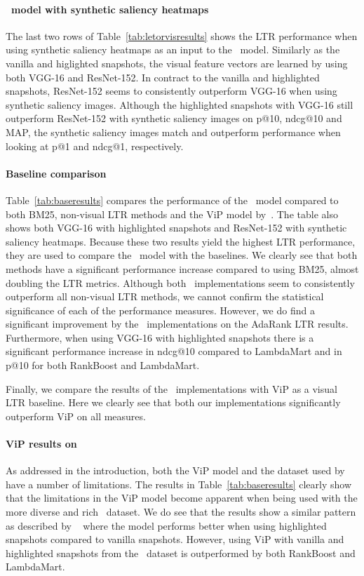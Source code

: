 \paragraph{\modelname~model with synthetic saliency heatmaps}
The last two rows of Table~\ref{tab:letorvisresults} shows the \ac{LTR} performance when using synthetic saliency heatmaps as an input to the \modelname~model. Similarly as the vanilla and higlighted snapshots, the visual feature vectors are learned by using both VGG-16 and ResNet-152. In contract to the vanilla and highlighted snapshots, ResNet-152 seems to consistently outperform VGG-16 when using synthetic saliency images. Although the highlighted snapshots with VGG-16 still outperform ResNet-152 with synthetic saliency images on p@10, ndcg@10 and MAP, the synthetic saliency images match and outperform performance when looking at p@1 and ndcg@1, respectively. 

\paragraph{Baseline comparison}
Table~\ref{tab:baseresults} compares the performance of the \modelname~model compared to both BM25, non-visual \ac{LTR} methods and the ViP model by~\citet{fan2017learning}. 
The table also shows both VGG-16 with highlighted snapshots and ResNet-152 with synthetic saliency heatmaps. Because these two results yield the highest \ac{LTR} performance, they are used to compare the \modelname~model with the baselines. 
We clearly see that both methods have a significant performance increase compared to using BM25, almost doubling the \ac{LTR} metrics.
Although both \modelname~implementations seem to consistently outperform all non-visual \ac{LTR} methods, we cannot confirm the statistical significance of each of the performance measures. 
However, we do find a significant improvement by the \modelname~implementations on the AdaRank \ac{LTR} results. Furthermore, when using VGG-16 with highlighted snapshots there is a significant performance increase in ndcg@10 compared to LambdaMart and in p@10 for both RankBoost and LambdaMart.

Finally, we compare the results of the \modelname~implementations with ViP as a visual \ac{LTR} baseline. 
Here we clearly see that both our implementations significantly outperform ViP on all measures. 

\paragraph{ViP results on \datasetname}
As addressed in the introduction, both the ViP model and the dataset used by~\citet{fan2017learning} have a number of limitations. The results in Table~\ref{tab:baseresults} clearly show that the limitations in the ViP model become apparent when being used with the more diverse and rich \datasetname~dataset. We do see that the results show a similar pattern as described by ~\citet{fan2017learning} where the model performs better when using highlighted snapshots compared to vanilla snapshots. However, using ViP with vanilla and highlighted snapshots from the \datasetname~dataset is outperformed by both RankBoost and LambdaMart. 

